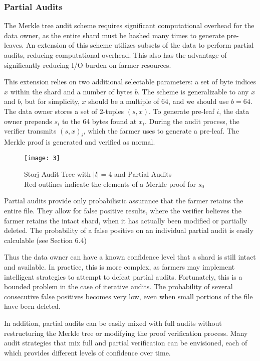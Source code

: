 \documentclass[a4paper,10pt]{article}
\begin{document}
\subsubsection{Partial Audits}
The Merkle tree audit scheme requires significant computational overhead for the data owner, as the entire shard must be hashed many times to generate pre-leaves. An extension of this scheme utilizes subsets of the data to perform partial audits, reducing computational overhead. This also has the advantage of significantly reducing I/O burden on farmer resources.

This extension relies on two additional selectable parameters: a set of byte indices $ x $ within the shard and a number of bytes $ b $. The scheme is generalizable to any $ x $ and $ b $, but for simplicity, $ x $ should be a multiple of 64, and we should use $ b = 64 $. The data owner stores a set of 2-tuples $ (s, x) $. To generate pre-leaf $ i $, the data owner prepends $ s_{i} $ to the 64 bytes found at $ x_{i} $. During the audit process, the verifier transmits $ (s, x)_{i} $, which the farmer uses to generate a pre-leaf. The Merkle proof is generated and verified as normal.

\begin{figure}[hbt]
\centering
\texttt{[image: 3]}
\caption{Storj Audit Tree with $ |l| = 4 $ and Partial Audits\\Red outlines indicate the elements of a Merkle proof for $ s_{0} $}
\end{figure}

Partial audits provide only probabilistic assurance that the farmer retains the entire file. They allow for false positive results, where the verifier believes the farmer retains the intact shard, when it has actually been modified or partially deleted. The probability of a false positive on an individual partial audit is easily calculable (see Section 6.4)

Thus the data owner can have a known confidence level that a shard is still intact and available. In practice, this is more complex, as farmers may implement intelligent strategies to attempt to defeat partial audits. Fortunately, this is a bounded problem in the case of iterative audits. The probability of several consecutive false positives becomes very low, even when small portions of the file have been deleted.

In addition, partial audits can be easily mixed with full audits without restructuring the Merkle tree or modifying the proof verification process. Many audit strategies that mix full and partial verification can be envisioned, each of which provides different levels of confidence over time.
\end{document}
